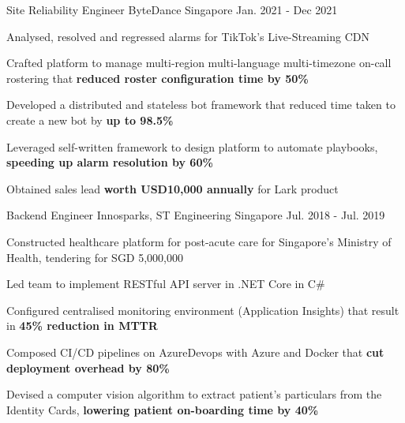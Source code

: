 \begin{cventries}
    \cventry
    {Site Reliability Engineer} %
    {ByteDance} %
    {Singapore} %
    {Jan. 2021 - Dec 2021} %
    {
    \begin{cvitems} %
        \item {Analysed, resolved and regressed alarms for TikTok's Live-Streaming CDN}
        \item {Crafted platform to manage multi-region multi-language multi-timezone on-call rostering that \textbf{reduced roster configuration time by 50\%}}
        \item {Developed a distributed and stateless bot framework that reduced time taken to create a new bot by \textbf{up to 98.5\%}}
        \item {Leveraged self-written framework to design platform to automate playbooks, \textbf{speeding up alarm resolution by 60\%}}
        \item {Obtained sales lead \textbf{worth USD10,000 annually} for Lark product}
    \end{cvitems}
    }

    \cventry
    {Backend Engineer} %
    {Innosparks, ST Engineering} %
    {Singapore} %
    {Jul. 2018 - Jul. 2019} %
    {
    \begin{cvitems} %
        \item {Constructed healthcare platform for post-acute care for Singapore's Ministry of Health, tendering for SGD 5,000,000}
        \item {Led team to implement RESTful API server in .NET Core in C\#}
        \item {Configured centralised monitoring environment (Application Insights) that result in \textbf{45\% reduction in MTTR}}
        \item {Composed CI/CD pipelines on AzureDevops with Azure and Docker that \textbf{cut deployment overhead by 80\%}}
        \item {Devised a computer vision algorithm to extract patient's particulars from the Identity Cards, \textbf{lowering patient on-boarding time by 40\%}}
    \end{cvitems}
    }


\end{cventries}
